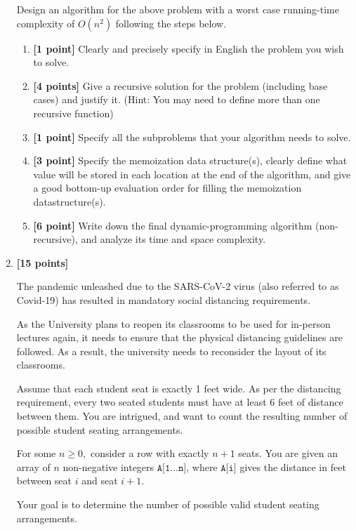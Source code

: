 \documentclass{assignment-373}
\begin{document}
\begin{enumerate}
  
  Design an algorithm for the above problem with a worst case
  running-time complexity of $O(n^2)$ following the steps below.
  \begin{enumerate}
  \item \textbf{[1 point]} Clearly and precisely specify in English
    the problem you wish to solve.
  \item \textbf{[4 points]} Give a recursive solution for the
    problem (including base cases) and justify it. (Hint: You may
    need to define more than one recursive function)
  \item \textbf{[1 point]} Specify all the subproblems that your
    algorithm needs to solve.
  \item \textbf{[3 point]} Specify the memoization data structure(s),
    clearly define what value will be stored in each location at the
    end of the algorithm, and give a good bottom-up evaluation order
    for filling the memoization datastructure(s).
  \item \textbf{[6 point]} Write down the final
    dynamic-programming algorithm (non-recursive), and analyze its
    time and space complexity.
  \end{enumerate}
  \medskip
  \medskip

      
\item \textbf{[15 points]}

  The pandemic unleashed due to the SARS-CoV-2 virus (also referred to
  as Covid-19) has resulted in mandatory social distancing
  requirements.

  As the University plans to reopen its classrooms to be used for
  in-person lectures again, it needs to ensure that the physical
  distancing guidelines are followed. 
  As a result, the university needs to reconsider the layout of its
  classrooms.

  Assume that each student seat is exactly 1 feet wide.
  As per the distancing requirement, every two seated students must
  have at least 6 feet of distance between them.
  You are intrigued, and want to count the resulting number of
  possible student seating arrangements.

  For some $n \ge 0,$ consider a row with exactly $n+1$ seats.
  You are given an array of $n$ non-negative integers
  $\texttt{A[1...n]}$, where $\texttt{A[i]}$ gives the distance in feet
  between seat $i$ and seat $i+1.$

  Your goal is to determine the number of possible valid student
  seating arrangements.


\end{enumerate}
\end{document}

